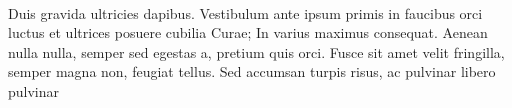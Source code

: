 \paragraph{}Duis gravida ultricies dapibus. Vestibulum ante ipsum primis in faucibus orci luctus et ultrices posuere cubilia Curae; In varius maximus consequat. Aenean nulla nulla, semper sed egestas a, pretium quis orci. Fusce sit amet velit fringilla, semper magna non, feugiat tellus. Sed accumsan turpis risus, ac pulvinar libero pulvinar 


